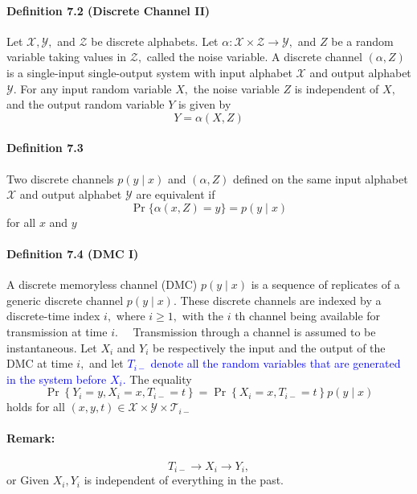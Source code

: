 \documentclass[8pt]{article}
\begin{document}
\paragraph{Definition 7.2 (Discrete Channel II)} Let $\mathcal{X}, \mathcal{Y},$ and $\mathcal{Z}$ be discrete alphabets. Let $\alpha: \mathcal{X} \times \mathcal{Z} \rightarrow \mathcal{Y},$ and $Z$ be a random variable taking values in $\mathcal{Z},$ called the noise variable. A discrete channel $(\alpha, Z)$ is a single-input single-output system with input alphabet $\mathcal{X}$ and output alphabet $\mathcal{Y} .$ For any input random variable $X,$ the noise variable $Z$ is independent of $X,$ and the output random variable $Y$ is given by
$$
Y=\alpha(X, Z)
$$

\begin{tcolorbox}
\paragraph{Definition 7.3} Two discrete channels $p(y \mid x)$ and $(\alpha, Z)$ defined on the same input alphabet $\mathcal{X}$ and output alphabet $\mathcal{Y}$ are equivalent if
$$
\operatorname{Pr}\{\alpha(x, Z)=y\}=p(y \mid x)
$$
for all $x$ and $y$
\end{tcolorbox}

\paragraph{Definition 7.4 (DMC I)} A discrete memoryless channel (DMC) $p(y \mid x)$ is a sequence of replicates of a generic discrete channel $p(y \mid x) .$ These discrete channels are indexed by a discrete-time index $i,$ where $i \geq 1,$ with the $i$ th channel being available for transmission at time $i . \quad$ Transmission through a channel is assumed to be instantaneous. Let $X_{i}$ and $Y_{i}$ be respectively the input and the output of the DMC at time $i,$ and let \textcolor{blue}{$T_{i-}$ denote all the random variables that are generated in the system before $X_{i} .$} The equality
$$
\operatorname{Pr}\left\{Y_{i}=y, X_{i}=x, T_{i-}=t\right\}=\operatorname{Pr}\left\{X_{i}=x, T_{i-}=t\right\} p(y \mid x)
$$
holds for all $(x, y, t) \in \mathcal{X} \times \mathcal{Y} \times \mathcal{T}_{i-}$

\begin{tcolorbox}
\paragraph{Remark:} $$T_{i-} \rightarrow X_{i} \rightarrow Y_{i},$$ or
Given $X_{i}, Y_{i}$ is independent of everything in the past.
\end{tcolorbox}
\end{document}
